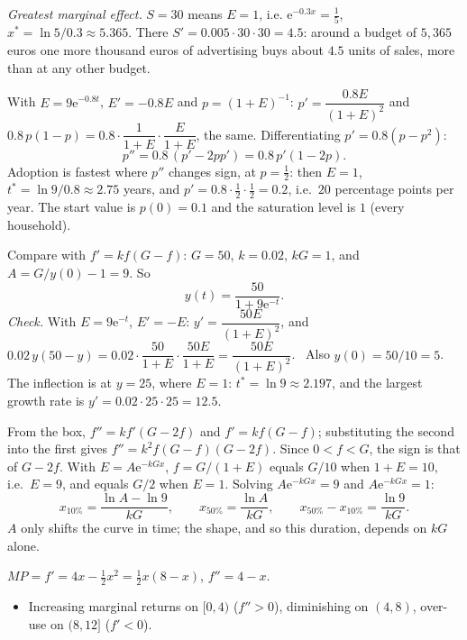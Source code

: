 \begin{solutions}
        \emph{Greatest marginal effect.} $S=30$ means $E=1$, i.e.
        $\mathrm{e}^{-0.3x}=\tfrac15$, $x^{*}=\ln5/0.3\approx5.365$. There
        $S'=0.005\cdot30\cdot30=4.5$: around a budget of $5{,}365$ euros
        one more thousand euros of advertising buys about $4.5$ units of
        sales, more than at any other budget.
  \item With $E=9\mathrm{e}^{-0.8t}$, $E'=-0.8E$ and $p=(1+E)^{-1}$:
        $p'=\dfrac{0.8E}{(1+E)^{2}}$ and
        $0.8\,p(1-p)=0.8\cdot\dfrac{1}{1+E}\cdot\dfrac{E}{1+E}$, the same.
        Differentiating $p'=0.8(p-p^{2})$:
        \[
          p''=0.8\,(p'-2pp')=0.8\,p'(1-2p) .
        \]
        Adoption is fastest where $p''$ changes sign, at $p=\tfrac12$: then
        $E=1$, $t^{*}=\ln9/0.8\approx2.75$ years, and
        $p'=0.8\cdot\tfrac12\cdot\tfrac12=0.2$, i.e.\ $20$ percentage
        points per year. The start value is $p(0)=0.1$ and the saturation
        level is $1$ (every household).
  \item Compare with $f'=kf(G-f)$: $G=50$, $k=0.02$, $kG=1$, and
        $A=G/y(0)-1=9$. So
        \[
          y(t)=\frac{50}{1+9\mathrm{e}^{-t}} .
        \]
        \emph{Check.} With $E=9\mathrm{e}^{-t}$, $E'=-E$:
        $y'=\dfrac{50E}{(1+E)^{2}}$, and
        $0.02\,y(50-y)=0.02\cdot\dfrac{50}{1+E}\cdot\dfrac{50E}{1+E}
        =\dfrac{50E}{(1+E)^{2}}$. \checkmark\ Also $y(0)=50/10=5$.
        The inflection is at $y=25$, where $E=1$: $t^{*}=\ln9\approx2.197$,
        and the largest growth rate is $y'=0.02\cdot25\cdot25=12.5$.
  \item From the box, $f''=kf'(G-2f)$ and $f'=kf(G-f)$; substituting the
        second into the first gives $f''=k^{2}f(G-f)(G-2f)$. Since
        $0<f<G$, the sign is that of $G-2f$.
        With $E=A\mathrm{e}^{-kGx}$, $f=G/(1+E)$ equals $G/10$ when
        $1+E=10$, i.e.\ $E=9$, and equals $G/2$ when $E=1$. Solving
        $A\mathrm{e}^{-kGx}=9$ and $A\mathrm{e}^{-kGx}=1$:
        \[
          x_{10\%}=\frac{\ln A-\ln9}{kG},\qquad x_{50\%}=\frac{\ln A}{kG},
          \qquad x_{50\%}-x_{10\%}=\frac{\ln9}{kG} .
        \]
        $A$ only shifts the curve in time; the shape, and so this
        duration, depends on $kG$ alone.
  \item $MP=f'=4x-\tfrac12x^{2}=\tfrac12x(8-x)$, $f''=4-x$.
        \begin{itemize}[leftmargin=1.2em,itemsep=0.2ex]
          \item Increasing marginal returns on $[0,4)$ ($f''>0$),
                diminishing on $(4,8)$, over-use on $(8,12]$ ($f'<0$).

\end{itemize}
\end{solutions}
